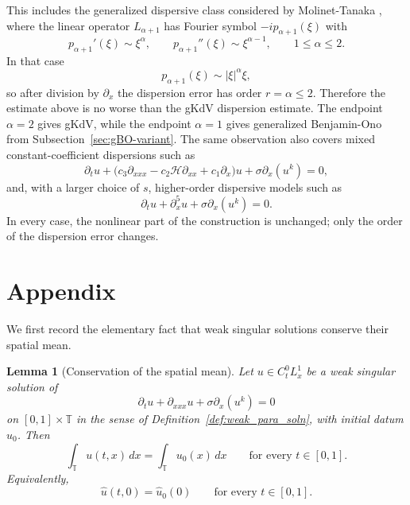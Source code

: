 \documentclass[12pt,reqno,letterpaper]{amsart}
\numberwithin{equation}{section}
\newcommand{\1}{{\bf 1}}
\newcommand{\2}{{\bf 2}}
\newcommand{\T}{\mathbb T}
\newtheorem{lemma}[theorem]{Lemma}
\theoremstyle{remark}
\theoremstyle{remark}
\begin{document}
This includes the generalized dispersive class considered by Molinet-Tanaka
\cite{MT}, where the linear operator $L_{\alpha+1}$ has Fourier
symbol $-ip_{\alpha+1}(\xi)$ with
\[
    p_{\alpha+1}'(\xi)\sim \xi^\alpha,
    \qquad
    p_{\alpha+1}''(\xi)\sim \xi^{\alpha-1},
    \qquad
    1\le\alpha\le2.
\]
In that case
\[
    p_{\alpha+1}(\xi)\sim |\xi|^\alpha\xi,
\]
so after division by $\partial_x$ the dispersion error has order
$r=\alpha\le2$.  Therefore the estimate above is no worse than the \textsf{gKdV}
dispersion estimate.  The endpoint $\alpha=2$ gives \textsf{gKdV}, while the endpoint
$\alpha=1$ gives generalized Benjamin-Ono from Subsection~\ref{sec:gBO-variant}.
The same observation also covers mixed constant-coefficient dispersions such as
\[
    \partial_tu+
    \bigl(
        c_3\partial_{xxx}
        -c_2\mathcal H\partial_{xx}
        +c_1\partial_x
    \bigr)u
    +\sigma\partial_x(u^k)=0,
\]
and, with a larger choice of $s$, higher-order dispersive models such as
\[
    \partial_tu+\partial_x^5u+\sigma\partial_x(u^k)=0.
\]
In every case, the nonlinear part of the construction is unchanged; only the
order of the dispersion error changes.





\section{Appendix}\label{sec:appendix}
We first record the elementary fact that weak singular solutions conserve their
spatial mean.

\begin{lemma}[Conservation of the spatial mean]\label{lem:mean-conservation}
Let $u \in C_t^0 L_x^1$ be a weak singular solution of
\[
\partial_t u+\partial_{xxx}u+\sigma\partial_x(u^k)=0
\]
on $[0,1]\times\T$ in the sense of Definition~\ref{def:weak_para_soln},
with initial datum $u_0$. Then
\[
\int_{\T}u(t,x)\,dx=\int_{\T}u_0(x)\,dx
\qquad
\text{for every }t\in[0,1].
\]
Equivalently,
\[
\hat{u}(t,0)=\hat{u}_0(0)
\qquad
\text{for every }t\in[0,1].
\]
\end{lemma}
\end{document}
